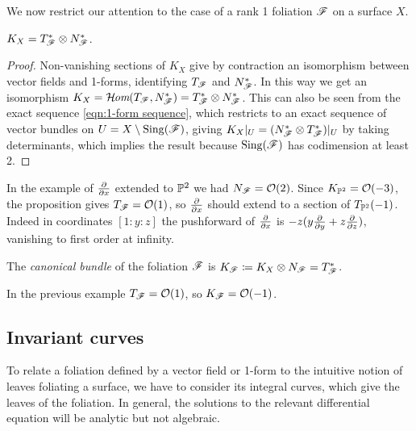 We now restrict our attention to the case of a rank 1 foliation $\scrF$ on a
surface $X$.

\begin{proposition}\label{prop:canonical}
    $K_X=T_\scrF^*\otimes N_\scrF^*$.
\end{proposition}

\begin{proof}
    Non-vanishing sections of $K_X$ give by contraction an isomorphism between
    vector fields and 1-forms, identifying $T_\scrF$ and $N_\scrF^*$. In this
    way we get an isomorphism
    $K_X=\shHom(T_\scrF,N_\scrF^*)=T_\scrF^*\otimes N_\scrF^*$. This can also be
    seen from the exact sequence \cref{eqn:1-form sequence}, which restricts to
    an exact sequence of vector bundles on $U=X\setminus\Sing(\scrF)$, giving
    $K_X|_U=(N_\scrF^*\otimes T_\scrF^*)|_U$ by taking determinants, which
    implies the result because $\Sing(\scrF)$ has codimension at least 2.
\end{proof}

\begin{example}\label{ex:P2 tangent}
    In the example of $\pdv{}{x}$ extended to $\P^2$ we had $N_\scrF=\O(2)$.
    Since $K_{\P^2}=\O(-3)$, the proposition gives $T_\scrF=\O(1)$, so
    $\pdv{}{x}$ should extend to a section of $T_{\P^2}(-1)$. Indeed in
    coordinates $[1:y:z]$ the pushforward of $\pdv{}{x}$ is
    $-z(y\pdv{}{y}+z\pdv{}{z})$, vanishing to first order at infinity.
\end{example}

\begin{definition}
    The \emph{canonical bundle} of the foliation $\scrF$ is
    $K_\scrF\coloneqq K_X\otimes N_\scrF=T_\scrF^*$.
\end{definition}

\begin{example}
    In the previous example $T_\scrF=\O(1)$, so $K_\scrF=\O(-1)$.
\end{example}


\subsection{Invariant curves}

To relate a foliation defined by a vector field or 1-form to the intuitive
notion of leaves foliating a surface, we have to consider its integral curves,
which give the leaves of the foliation. In general, the solutions to the
relevant differential equation will be analytic but not algebraic.

